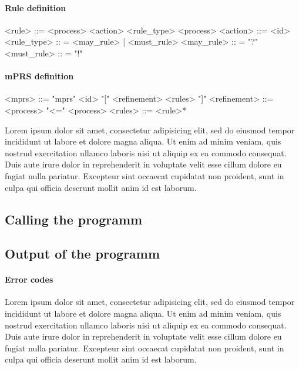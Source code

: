 \paragraph{Rule definition}
\begin{grammar}
<rule> ::= <process> <action> <rule_type> <process>
<action> ::= <id>
<rule_type> :: = <may_rule> | <must_rule>
<may_rule> :: = "?"
<must_rule> :: = "!"
\end{grammar}

\paragraph{mPRS definition}
\begin{grammar}
<mprs> ::= "mprs" <id> "[" <refinement> <rules> "]"
<refinement> ::= <process> "<=" <process>
<rules> ::= <rule>*
\end{grammar}


Lorem ipsum dolor sit amet, consectetur adipisicing elit, sed do eiusmod tempor incididunt ut labore et dolore magna aliqua. Ut enim ad minim veniam, quis nostrud exercitation ullamco laboris nisi ut aliquip ex ea commodo consequat. Duis aute irure dolor in reprehenderit in voluptate velit esse cillum dolore eu fugiat nulla pariatur. Excepteur sint occaecat cupidatat non proident, sunt in culpa qui officia deserunt mollit anim id est laborum.

\subsection{Calling the programm}

\subsection{Output of the programm}

\paragraph{Error codes}

Lorem ipsum dolor sit amet, consectetur adipisicing elit, sed do eiusmod tempor incididunt ut labore et dolore magna aliqua. Ut enim ad minim veniam, quis nostrud exercitation ullamco laboris nisi ut aliquip ex ea commodo consequat. Duis aute irure dolor in reprehenderit in voluptate velit esse cillum dolore eu fugiat nulla pariatur. Excepteur sint occaecat cupidatat non proident, sunt in culpa qui officia deserunt mollit anim id est laborum.

